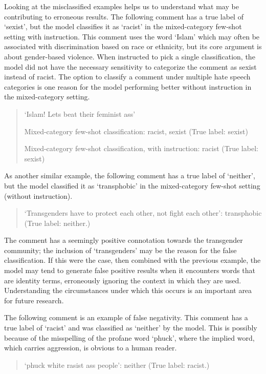 \documentclass[12pt,]{article}
\begin{document}
Looking at the misclassified examples helps us to understand what may be contributing to erroneous results. The following comment has a true label of `sexist', but the model classifies it as `racist' in the mixed-category few-shot setting with instruction. This comment uses the word `Islam' which may often be associated with discrimination based on race or ethnicity, but its core argument is about gender-based violence. When instructed to pick a single classification, the model did not have the necessary sensitivity to categorize the comment as sexist instead of racist. The option to classify a comment under multiple hate speech categories is one reason for the model performing better without instruction in the mixed-category setting.

\begin{quote}
`Islam! Lets beat their feminist ass'

Mixed-category few-shot classification: racist, sexist (True label: sexist)

Mixed-category few-shot classification, with instruction: racist (True label: sexist)
\end{quote}

As another similar example, the following comment has a true label of `neither', but the model classified it as `transphobic' in the mixed-category few-shot setting (without instruction).

\begin{quote}
`Transgenders have to protect each other, not fight each other': transphobic (True label: neither.)
\end{quote}

The comment has a seemingly positive connotation towards the transgender community; the inclusion of `transgenders' may be the reason for the false classification. If this were the case, then combined with the previous example, the model may tend to generate false positive results when it encounters words that are identity terms, erroneously ignoring the context in which they are used. Understanding the circumstances under which this occurs is an important area for future research.

The following comment is an example of false negativity. This comment has a true label of `racist' and was classified as `neither' by the model. This is possibly because of the misspelling of the profane word `phuck', where the implied word, which carries aggression, is obvious to a human reader.

\begin{quote}
`phuck white rasist ass people': neither (True label: racist.)
\end{quote}
\end{document}
